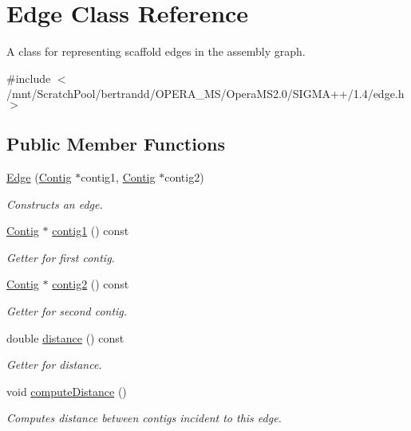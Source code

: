 \hypertarget{classEdge}{
\section{Edge Class Reference}
\label{classEdge}
}


A class for representing scaffold edges in the assembly graph.  


{\ttfamily \#include $<$/mnt/ScratchPool/bertrandd/OPERA\_\-MS/OperaMS2.0/SIGMA++/1.4/edge.h$>$}\subsection*{Public Member Functions}
\begin{DoxyCompactItemize}
\item 
\hyperlink{classEdge_a2004a36608f1b6315e35f52db6dad158}{Edge} (\hyperlink{classContig}{Contig} $\ast$contig1, \hyperlink{classContig}{Contig} $\ast$contig2)
\begin{DoxyCompactList}\small\item\em Constructs an edge. \item\end{DoxyCompactList}\item 
\hyperlink{classContig}{Contig} $\ast$ \hyperlink{classEdge_a30961b15102ee33f9fd67001602a7296}{contig1} () const 
\begin{DoxyCompactList}\small\item\em Getter for first contig. \item\end{DoxyCompactList}\item 
\hyperlink{classContig}{Contig} $\ast$ \hyperlink{classEdge_afc2ab7144ce4fcf9b6ec54ec63b034fe}{contig2} () const 
\begin{DoxyCompactList}\small\item\em Getter for second contig. \item\end{DoxyCompactList}\item 
double \hyperlink{classEdge_a8f7680604c7fb101504f479be01d9c12}{distance} () const 
\begin{DoxyCompactList}\small\item\em Getter for distance. \item\end{DoxyCompactList}\item 
void \hyperlink{classEdge_a271ab16896c1691751940810b823d2bc}{computeDistance} ()
\begin{DoxyCompactList}\small\item\em Computes distance between contigs incident to this edge. \item\end{DoxyCompactList}\end{DoxyCompactItemize}
